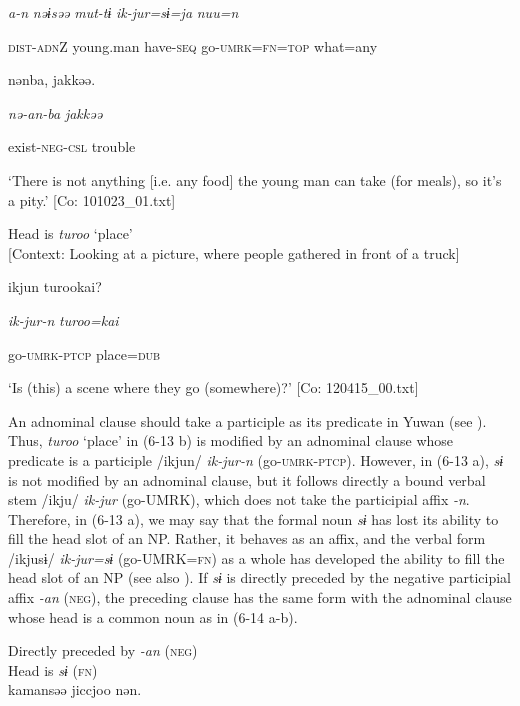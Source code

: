     \textit{a-n}  \textit{nəɨsəə}  \textit{mut-tɨ}  \textit{ik-jur=sɨ=ja}  \textit{nuu=n}

    \textsc{dist}-\textsc{adn}Z  young.man  have-\textsc{seq}  go-\textsc{umrk}=\textsc{fn}=\textsc{top}  what=any

    nənba,  jakkəə.

    \textit{nə-an-ba}  \textit{jakkəə}

    exist-\textsc{neg}-\textsc{csl}  trouble

\glt    ‘There is not anything [i.e. any food] the young man can take (for meals), so it’s a pity.’ [Co: 101023\_01.txt]
\z

\ex Head is \textit{turoo} ‘place’\\

  [Context: Looking at a picture, where people gathered in front of a truck]

{\TM}
\gll ikjun  turookai?

    \textit{ik-jur-n}  \textit{turoo=kai}

    go-\textsc{umrk}-\textsc{ptcp}  place=\textsc{dub}

\glt    ‘Is (this) a scene where they go (somewhere)?’ [Co: 120415\_00.txt]
\z

An adnominal clause should take a participle as its predicate in Yuwan (see ). Thus, \textit{turoo} ‘place’ in (6-13 b) is modified by an adnominal clause whose predicate is a participle /ikjun/ \textit{ik-jur-n} (go-\textsc{umrk}-\textsc{ptcp}). However, in (6-13 a), \textit{sɨ} is not modified by an adnominal clause, but it follows directly a bound verbal stem /ikju/ \textit{ik-jur} (go-UMRK), which does not take the participial affix \textit{{}-n}. Therefore, in (6-13 a), we may say that the formal noun \textit{sɨ} has lost its ability to fill the head slot of an NP. Rather, it behaves as an affix, and the verbal form /ikjusɨ/ \textit{ik-jur=sɨ} (go-UMRK=\textsc{fn}) as a whole has developed the ability to fill the head slot of an NP (see also ). If \textit{sɨ} is directly preceded by the negative participial affix \textit{{}-an} (\textsc{neg}), the preceding clause has the same form with the adnominal clause whose head is a common noun as in (6-14 a-b).

\ea\label{ex:6-14}
 Directly preceded by \textit{{}-an} (\textsc{neg})\\

 \ea Head is \textit{sɨ} (\textsc{fn})\\
{\TM}
\gll  kamansəə  jiccjoo  nən.\\

